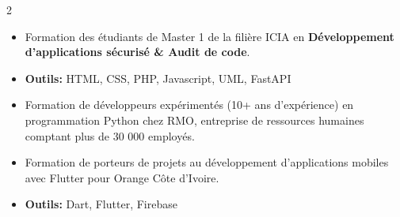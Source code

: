 \documentclass[10pt,a4paper,ragged2e,withhyper]{altacv}
\begin{document}
\begin{paracol}{2}
            \begin{itemize}
                \item Formation des étudiants de Master 1 de la filière ICIA en {\textbf{Développement d’applications sécurisé \& Audit de code}}.
                \item \textcolor{SecondaryColor}{\textbf{Outils: }} HTML, CSS, PHP, Javascript, UML, FastAPI
            \end{itemize}
            \divider

            \begin{itemize}
                \item Formation de développeurs expérimentés (10+ ans d'expérience) en programmation Python chez RMO, entreprise de ressources humaines comptant plus de 30 000 employés.
            \end{itemize}
            \divider

            \begin{itemize}
                \item Formation de porteurs de projets au développement d'applications mobiles avec Flutter pour Orange Côte d'Ivoire.
                \item \textcolor{SecondaryColor}{\textbf{Outils: }} Dart, Flutter, Firebase
            \end{itemize}
            \divider

            \newpage


\end{paracol}
\end{document}
